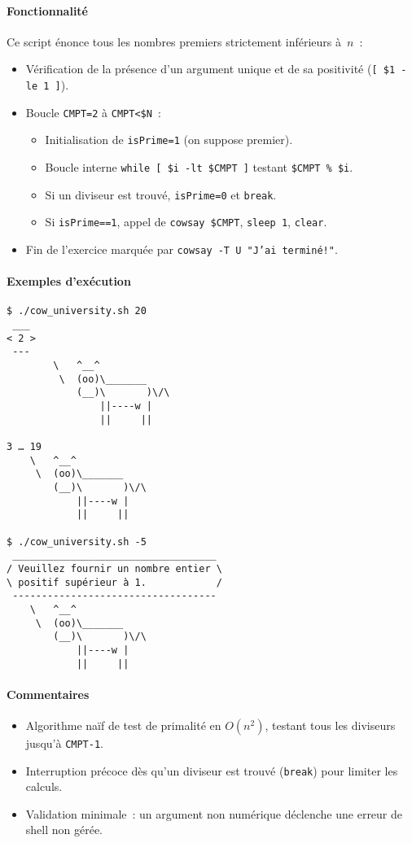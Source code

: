 \documentclass[a4paper,french,11pt]{article}
\begin{document}
\paragraph{Fonctionnalité}  
Ce script énonce tous les nombres premiers strictement inférieurs à $n$ :
\begin{itemize}
  \item Vérification de la présence d’un argument unique et de sa positivité (\texttt{[ \$1 -le 1 ]}).  
  \item Boucle \texttt{CMPT=2} à \texttt{CMPT<\$N} :
    \begin{itemize}
      \item Initialisation de \texttt{isPrime=1} (on suppose premier).  
      \item Boucle interne \texttt{while [ \$i -lt \$CMPT ]} testant \texttt{\$CMPT \% \$i}.  
      \item Si un diviseur est trouvé, \texttt{isPrime=0} et \texttt{break}.  
      \item Si \texttt{isPrime==1}, appel de \texttt{cowsay \$CMPT}, \texttt{sleep 1}, \texttt{clear}.
    \end{itemize}
  \item Fin de l’exercice marquée par \texttt{cowsay -T U "J’ai terminé!"}.
\end{itemize}

\paragraph{Exemples d’exécution}
\begin{verbatim}
$ ./cow_university.sh 20
 ___
< 2 >
 ---
        \   ^__^
         \  (oo)\_______
            (__)\       )\/\
                ||----w |
                ||     || 

3 … 19  
    \   ^__^
     \  (oo)\_______
        (__)\       )\/\
            ||----w |
            ||     ||

$ ./cow_university.sh -5
 ___________________________________
/ Veuillez fournir un nombre entier \
\ positif supérieur à 1.            /
 -----------------------------------
    \   ^__^
     \  (oo)\_______
        (__)\       )\/\
            ||----w |
            ||     ||
\end{verbatim}

\paragraph{Commentaires}  
\begin{itemize}
  \item Algorithme naïf de test de primalité en $O(n^2)$, testant tous les diviseurs jusqu’à \texttt{CMPT-1}.  
  \item Interruption précoce dès qu’un diviseur est trouvé (\texttt{break}) pour limiter les calculs.  
  \item Validation minimale : un argument non numérique déclenche une erreur de shell non gérée.  
\end{itemize}
\end{document}
